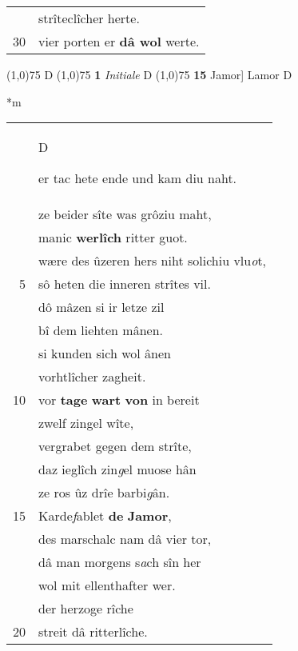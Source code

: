 \documentclass[8pt,a4paper,notitlepage]{article}
\begin{document}
\begin{table}[ht]
\begin{minipage}[t]{0.5\linewidth}
\begin{tabular}{rl}
 & strîteclîcher herte.\\ 
30 & vier porten er \textbf{dâ wol} werte.\\ 
\end{tabular}
\scriptsize
\line(1,0){75} \newline
D \newline
\line(1,0){75} \newline
\textbf{1} \textit{Initiale} D  \newline
\line(1,0){75} \newline
\textbf{15} Jamor] Lamor D \newline
\end{minipage}
\hspace{0.5cm}
\begin{minipage}[t]{0.5\linewidth}
\small
\begin{center}*m
\end{center}
\begin{tabular}{rl}
 & \begin{large}D\end{large}er tac hete ende und kam diu naht.\\ 
 & ze beider sîte was grôziu maht,\\ 
 & manic \textbf{werlîch} ritter guot.\\ 
 & wære des ûzeren hers niht solichiu vlu\textit{o}t,\\ 
5 & sô heten die inneren strîtes vil.\\ 
 & dô mâzen si ir letze zil\\ 
 & bî dem liehten mânen.\\ 
 & si kunden sich wol ânen\\ 
 & vorhtlîcher zagheit.\\ 
10 & vor \textbf{tage} \textbf{wart} \textbf{von} in bereit\\ 
 & zwelf zingel wîte,\\ 
 & vergrabet gegen dem strîte,\\ 
 & daz ieglîch zin\textit{g}el muose hân\\ 
 & ze ros ûz drîe barbi\textit{g}ân.\\ 
15 & Karde\textit{f}ablet \textbf{de} \textbf{Jamor},\\ 
 & des marschalc nam dâ vier tor,\\ 
 & dâ man morgens s\textit{a}ch sîn her\\ 
 & wol mit ellenthafter wer.\\ 
 & der herzoge rîche\\ 
20 & streit dâ ritterlîche.\\ 

\end{tabular}
\end{minipage}
\end{table}
\end{document}
